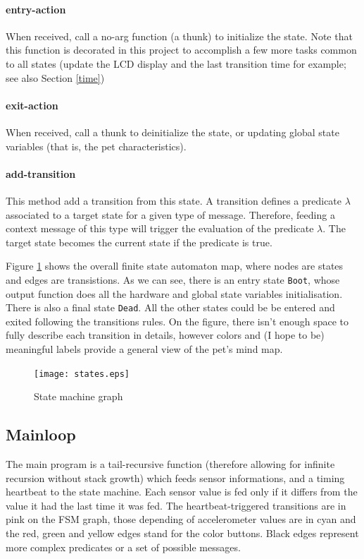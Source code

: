 \documentclass[a4paper]{article}
\begin{document}
\paragraph{entry-action}
When received, call a no-arg function (a thunk) to initialize the state. Note that this function is decorated in this project to accomplish a few more tasks common to all states (update the LCD display and the last transition time for example; see also Section \ref{time})

\paragraph{exit-action}
When received, call a thunk to deinitialize the state, or updating global state variables (that is, the pet characteristics).

\paragraph{add-transition}
This method add a transition from this state. A transition defines a predicate $\lambda$ associated to a target state for a given type of message. Therefore, feeding a context message of this type will trigger the evaluation of the predicate $\lambda$. The target state becomes the current state if the predicate is true.

Figure \ref{fig:states} shows the overall finite state automaton map, where nodes are states and edges are transistions. As we can see, there is an entry state \texttt{Boot}, whose output function does all the hardware and global state variables initialisation. There is also a final state \texttt{Dead}. All the other states could be be entered and exited following the transitions rules. On the figure, there isn't enough space to fully describe each transition in details, however colors and (I hope to be) meaningful labels provide a general view of the pet's mind map.

\begin{figure}[h]
  \texttt{[image: states.eps]}
  \caption{\label{fig:states} State machine graph}
\end{figure}

\subsection{Mainloop}
The main program is a tail-recursive function (therefore allowing for infinite recursion without stack growth) which feeds sensor informations, and a timing heartbeat to the state machine. Each sensor value is fed only if it differs from the value it had the last time it was fed. The heartbeat-triggered transitions are in pink on the FSM graph, those depending of accelerometer values are in cyan and the red, green and yellow edges stand for the color buttons. Black edges represent more complex predicates or a set of possible messages.
\end{document}
